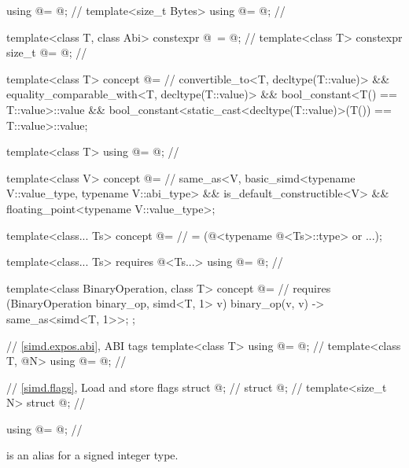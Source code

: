 \begin{codeblock}
using @\simdsizetype@ = @\seebelow@;                                 // \expos
template<size_t Bytes> using @\integerfrom@ = @\seebelow@;            // \expos

template<class T, class Abi>
  constexpr @\simdsizetype\ \simdsizev@ = @\seebelow@;               // \expos
template<class T> constexpr size_t @\maskelementsize@ = @\seebelow@; // \expos

template<class T>
  concept @\constexprwrapperlike@ =                                // \expos
    convertible_to<T, decltype(T::value)> &&
    equality_comparable_with<T, decltype(T::value)> &&
    bool_constant<T() == T::value>::value &&
    bool_constant<static_cast<decltype(T::value)>(T()) == T::value>::value;

template<class T> using @\deducedsimd@ = @\seebelow@;               // \expos

template<class V>
  concept @\simdfloatingpoint@ =                                   // \expos
    same_as<V, basic_simd<typename V::value_type, typename V::abi_type> &&
    is_default_constructible<V> && floating_point<typename V::value_type>;

template<class... Ts>
  concept @\mathfloatingpoint@ =                                   // \expos
    = (@\simdfloatingpoint@<typename @\deducedsimd@<Ts>::type> or ...);

template<class... Ts>
  requires @\mathfloatingpoint@<Ts...>
    using @\mathcommonsimd@ = @\seebelow@;                         // \expos

template<class BinaryOperation, class T>
  concept @\reductionoperation@ =                            // \expos
    requires (BinaryOperation binary_op, simd<T, 1> v) {
      { binary_op(v, v) } -> same_as<simd<T, 1>>;
    };

// \ref{simd.expos.abi},  ABI tags
template<class T> using @\nativeabi@ = @\seebelow@;                   // \expos
template<class T, @\simdsizetype@ N> using @\deducet@ = @\seebelow@;   // \expos

// \ref{simd.flags}, Load and store flags
struct @\convertflag@;                                              // \expos
struct @\alignedflag@;                                              // \expos
template<size_t N> struct @\overalignedflag@;                       // \expos
\end{codeblock}

\begin{itemdecl}
using @\simdsizetype@ = @\seebelow@; // \expos
\end{itemdecl}
\begin{itemdescr}
  \pnum
  \simdsizetype{} is an alias for a signed integer type.
\end{itemdescr}

